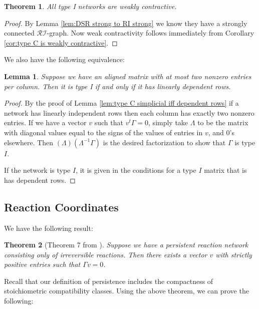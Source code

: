 \documentclass{article}
\newtheorem{thm}{Theorem}
\newtheorem{lem}{Lemma}
\begin{document}
\begin{thm}
    All type I networks are weakly contractive.
\end{thm}

\begin{proof}
    By Lemma \ref{lem:DSR strong to RI strong} we know they have a strongly connected \( \mathcal{RI} \)-graph. Now weak contractivity follows immediately from Corollary \ref{cor:type C is weakly contractive}.
\end{proof}


We also have the following equivalence:

\begin{lem}
    Suppose we have an aligned matrix with at most two nonzero entries per column. Then it is type I if and only if it has linearly dependent rows. 
\end{lem}

\begin{proof}

    By the proof of Lemma \ref{lem:type C simplicial iff dependent rows} if a network has linearly independent rows then each column has exactly two nonzero entries. If we have a vector $v$ such that $v^t \Gamma = 0$, simply take $\Lambda$ to be the matrix with diagonal values equal to the signs of the values of entries in $v$, and 0's elsewhere. Then $(\Lambda)(\Lambda^{-1} \Gamma)$ is the desired factorization to show that $\Gamma$ is type $I$.

    If the network is type $I$, it is given in the conditions for a type $I$ matrix that is has dependent rows.
\end{proof}



\subsection{Reaction Coordinates}
\label{sec:react_coordinates}


We have the following result:

\begin{thm}[Theorem 7 from \cite{ANGELI2007598}]
\label{thm:postive vect of fluxes equilibrium}
Suppose we have a persistent reaction network consisting only of irreversible reactions. Then there exists a vector \( v \) with strictly positive entries such that \( \Gamma v = 0 \).
\end{thm}

Recall that our definition of persistence includes the compactness of stoichiometric compatibility classes. Using the above theorem, we can prove the following:
\end{document}
